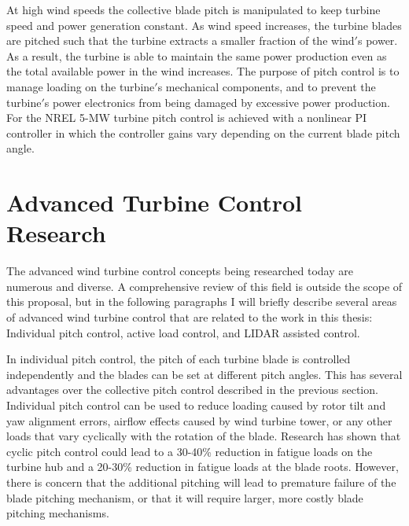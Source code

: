 At high wind speeds the collective blade pitch is manipulated to keep turbine speed and power generation constant. As wind speed increases, the turbine blades are pitched such that the turbine extracts a smaller fraction of the wind$'$s power.  As a result, the turbine is able to maintain the same power production even as the total available power in the wind increases.  The purpose of pitch control is to manage loading on the turbine$'$s mechanical components, and to prevent the turbine$'$s power electronics from being damaged by excessive power production.   For the NREL 5-MW turbine pitch control is achieved with a nonlinear PI controller in which the controller gains vary depending on the current blade pitch angle. 


\section{Advanced Turbine Control Research} 

The advanced wind turbine control concepts being researched today are numerous and diverse. A comprehensive review of this field is outside the scope of this proposal, but in the following paragraphs I will briefly describe several areas of advanced wind turbine control that are related to the work in this thesis: Individual pitch control, active load control, and LIDAR assisted control.

In individual pitch control, the pitch of each turbine blade is controlled independently and the blades can be set at different pitch angles.  This has several advantages over the collective pitch control described in the previous section. Individual pitch control can be used to reduce loading caused by rotor tilt and yaw alignment errors, airflow effects caused by wind turbine tower, or any other loads that vary cyclically with the rotation of the blade. Research has shown that cyclic pitch control could lead to a 30-40\% reduction in fatigue loads on the turbine hub and a 20-30\% reduction in fatigue loads at the blade roots.\cite{larsen2005,bossanyi2004} However, there is concern that the additional pitching will lead to premature failure of the blade pitching mechanism, or that it will require larger, more costly blade pitching mechanisms.\cite{vandam2008}

